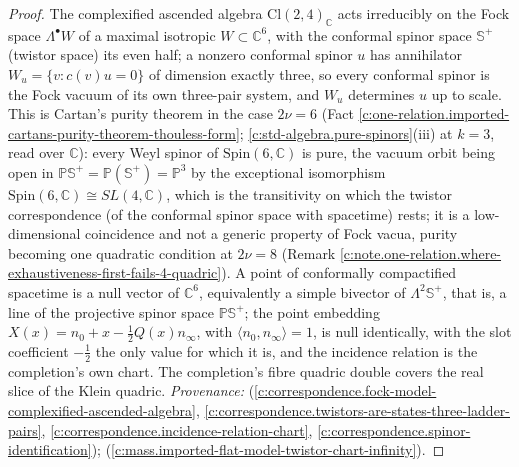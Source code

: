 \documentclass[11pt]{article}
\theoremstyle{definition}
\theoremstyle{plain}
\providecommand{\C}{}\renewcommand{\C}{\mathbb{C}}
\providecommand{\CS}{}\renewcommand{\CS}{{\mathbb{S}^{+}}}
\providecommand{\Cl}{}\renewcommand{\Cl}{\mathrm{Cl}}
\providecommand{\PCS}{}\renewcommand{\PCS}{\mathbb{P}{\mathbb{S}^{+}}}
\providecommand{\ip}{}\renewcommand{\ip}[2]{\langle #1, #2\rangle}
\begin{document}
\begin{proof}
The complexified ascended algebra $\Cl(2,4)_{\C}$ acts irreducibly on the Fock space $\Lambda^{\bullet}W$ of a maximal isotropic $W \subset \C^{6}$, with the conformal spinor space $\CS$ (twistor space) its even half; a nonzero conformal spinor $u$ has annihilator $W_{u} = \{v : c(v)u = 0\}$ of dimension exactly three, so every conformal spinor is the Fock vacuum of its own three-pair system, and $W_{u}$ determines $u$ up to scale. This is Cartan's purity theorem in the case $2\nu = 6$ (Fact \ref{c:one-relation.imported-cartans-purity-theorem-thouless-form}; \ref{c:std-algebra.pure-spinors}(iii) at $k = 3$, read over $\C$): every Weyl spinor of $\mathrm{Spin}(6, \C)$ is pure, the vacuum orbit being open in $\PCS = \mathbb{P}(\CS) = \mathbb{P}^{3}$ by the exceptional isomorphism $\mathrm{Spin}(6, \C) \cong SL(4, \C)$, which is the transitivity on which the twistor correspondence (of the conformal spinor space with spacetime) rests; it is a low-dimensional coincidence and not a generic property of Fock vacua, purity becoming one quadratic condition at $2\nu = 8$ (Remark \ref{c:note.one-relation.where-exhaustiveness-first-fails-4-quadric}). A point of conformally compactified spacetime is a null vector of $\C^{6}$, equivalently a simple bivector of $\Lambda^{2}\CS$, that is, a line of the projective spinor space $\PCS$; the point embedding $X(x) = n_{0} + x - \tfrac12 Q(x)n_{\infty}$, with $\ip{n_{0}}{n_{\infty}} = 1$, is null identically, with the slot coefficient $-\tfrac12$ the only value for which it is, and the incidence relation is the completion's own chart. The completion's fibre quadric double covers the real slice of the Klein quadric. \emph{Provenance:} \cite[Thm.~3.1, Thm.~3.4, Thm.~4.2, Thm.~5.3]{ButlerT9} (\ref{c:correspondence.fock-model-complexified-ascended-algebra}, \ref{c:correspondence.twistors-are-states-three-ladder-pairs}, \ref{c:correspondence.incidence-relation-chart}, \ref{c:correspondence.spinor-identification}); \cite[Fact~2.3, Rem.~5.2]{ButlerT11} (\ref{c:mass.imported-flat-model-twistor-chart-infinity}).

\end{proof}
\end{document}
